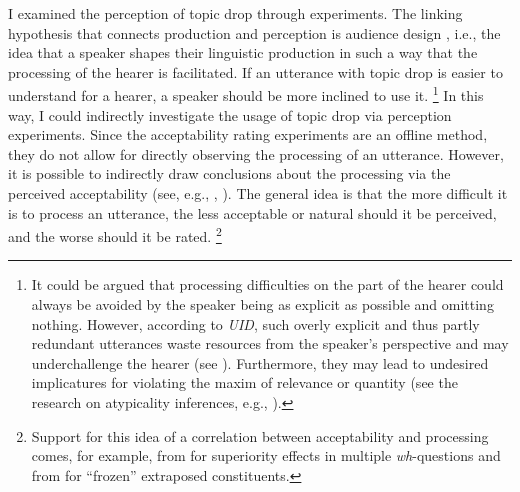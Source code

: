 I examined the perception of topic drop through experiments.
The linking hypothesis that connects production and perception is audience design \citep{bell1984}, i.e., the idea that a speaker shapes their linguistic production in such a way that the processing of the hearer is facilitated. 
If an utterance with topic drop is easier to understand for a hearer, a speaker should be more inclined to use it.%
\footnote{It could be argued that processing difficulties on the part of the hearer could always be avoided by the speaker being as explicit as possible and omitting nothing.
However, according to \textit{UID},  such overly explicit and thus partly redundant utterances waste resources from the speaker's perspective and may underchallenge the hearer (see ).
Furthermore, they may lead to undesired implicatures for violating the maxim of relevance or quantity (see the research on atypicality inferences, e.g., \citet{kravtchenko.demberg2022}).}
%
In this way, I could indirectly investigate the usage of topic drop via perception experiments.
Since the acceptability rating experiments are an offline method, they do not allow for directly observing the processing of an utterance.
However, it is possible to indirectly draw conclusions about the processing via the perceived acceptability (see, e.g., \cite{fanselow.frisch2006}, \cite{hofmeister.etal2014}).
The general idea is that the more difficult it is to process an utterance, the less acceptable or natural should it be perceived, and the worse should it be rated.%
\footnote{Support for this idea of a correlation between acceptability and processing comes, for example, from  \citet{hofmeister.etal2013} for superiority effects in multiple \textit{wh}-questions and from \citet{hofmeister.etal2015} for ``frozen'' extraposed constituents.}
%

